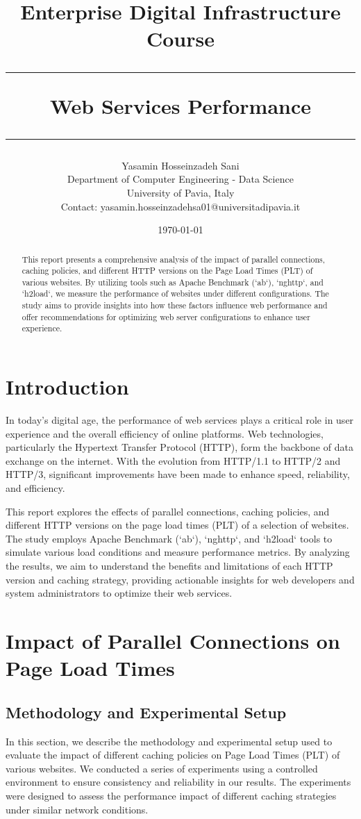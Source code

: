 \documentclass[a4paper,10pt]{article}
\title{\vspace{40mm}\Large {Enterprise Digital Infrastructure Course} \vspace{0.2cm}
     \rule{\textwidth}{0.3pt} \vspace{0.1cm} %
     \textbf{Web Services Performance} \vspace{0.0cm} %
     \rule{\textwidth}{0.3pt}}
\author{Yasamin Hosseinzadeh Sani \vspace{0.1cm}\\
        \small Department of Computer Engineering - Data Science \vspace{0.2cm}\\
        \small University of Pavia, Italy \vspace{0.2cm}\\
        \small Contact: yasamin.hosseinzadehsa01@universitadipavia.it}
\date{\today}
\begin{document}
\maketitle
\vspace{110mm}


\begin{abstract}
This report presents a comprehensive analysis of the impact of parallel connections, caching policies, and different HTTP versions on the Page Load Times (PLT) of various websites. By utilizing tools such as Apache Benchmark (`ab`), `nghttp`, and `h2load`, we measure the performance of websites under different configurations. The study aims to provide insights into how these factors influence web performance and offer recommendations for optimizing web server configurations to enhance user experience.
\end{abstract}

\section{Introduction}
In today's digital age, the performance of web services plays a critical role in user experience and the overall efficiency of online platforms. Web technologies, particularly the Hypertext Transfer Protocol (HTTP), form the backbone of data exchange on the internet. With the evolution from HTTP/1.1 to HTTP/2 and HTTP/3, significant improvements have been made to enhance speed, reliability, and efficiency.

This report explores the effects of parallel connections, caching policies, and different HTTP versions on the page load times (PLT) of a selection of websites. The study employs Apache Benchmark (`ab`), `nghttp`, and `h2load` tools to simulate various load conditions and measure performance metrics. By analyzing the results, we aim to understand the benefits and limitations of each HTTP version and caching strategy, providing actionable insights for web developers and system administrators to optimize their web services.

\section{Impact of Parallel Connections on Page Load Times}

\subsection{Methodology and Experimental Setup}
In this section, we describe the methodology and experimental setup used to evaluate the impact of different caching policies on Page Load Times (PLT) of various websites. We conducted a series of experiments using a controlled environment to ensure consistency and reliability in our results. The experiments were designed to assess the performance impact of different caching strategies under similar network conditions.
\end{document}
